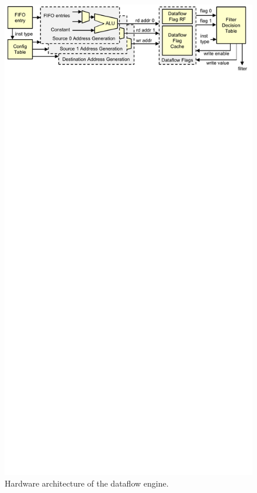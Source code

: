 \begin{figure}
  \begin{center}
    \includegraphics{monitoring_dift_drop/figs/dataflow_architecture.pdf}
    \caption{Hardware architecture of the dataflow engine.}
    \label{fig:monitoring_dift_drop.dropping.dataflow} 
  \end{center}
\end{figure}

